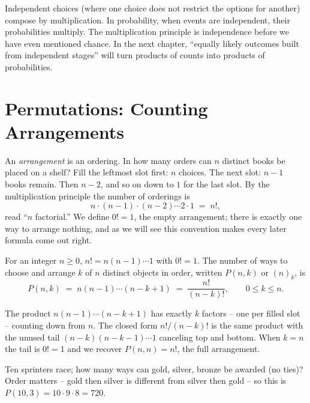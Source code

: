 \begin{happeningbox}
Independent choices (where one choice does not restrict the options for another) compose by multiplication.
In probability, when events are independent, their probabilities multiply. The multiplication principle is
independence before we have even mentioned chance. In
the next chapter, ``equally likely outcomes built from independent stages'' will turn
products of counts into products of probabilities.
\end{happeningbox}

\section{Permutations: Counting Arrangements}
\label{ch2:permutations}

An \emph{arrangement} is an ordering. In how many orders can $n$ distinct books be placed
on a shelf? Fill the leftmost slot first: $n$ choices. The next slot: $n-1$ books remain.
Then $n-2$, and so on down to $1$ for the last slot. By the multiplication principle the
number of orderings is
\[
  n \cdot (n-1) \cdot (n-2) \cdots 2 \cdot 1 \;=\; n!,
\]
read ``$n$ factorial.'' We define $0! = 1$, the empty arrangement; there is exactly one
way to arrange nothing, and as we will see this convention makes every later formula come
out right.

\begin{definition}
\label{ch2:def-perm}
For an integer $n \ge 0$, $n! = n(n-1)\cdots 1$ with $0! = 1$. The number of ways to choose
and arrange $k$ of $n$ distinct objects in order, written $P(n,k)$ or $(n)_k$, is
\[
  P(n,k) \;=\; n(n-1)\cdots(n-k+1) \;=\; \frac{n!}{(n-k)!}, \qquad 0 \le k \le n.
\]
\end{definition}

The product $n(n-1)\cdots(n-k+1)$ has exactly $k$ factors -- one per filled slot -- counting
down from $n$. The closed form $n!/(n-k)!$ is the same product with the unused tail
$(n-k)(n-k-1)\cdots 1$ canceling top and bottom. When $k = n$ the tail is $0! = 1$ and we
recover $P(n,n) = n!$, the full arrangement.

\begin{example}
\label{ch2:ex-podium}
Ten sprinters race; how many ways can gold, silver, bronze be awarded (no ties)?
Order matters -- gold then silver is different from silver then gold -- so this is
$P(10,3) = 10 \cdot 9 \cdot 8 = 720$.
\end{example}

